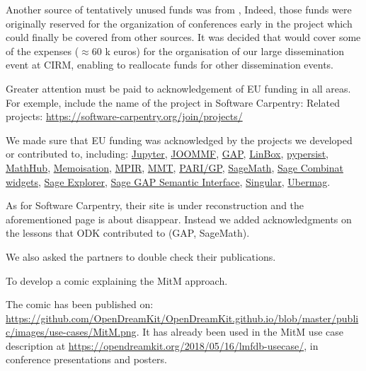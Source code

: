 Another source of tentatively unused funds was from ,
Indeed, those funds were originally reserved for the organization of
conferences early in the project which could finally be covered from
other sources. It was decided that  would cover some of
the expenses ($\approx$60 k euros) for the organisation of our large
dissemination event at CIRM, enabling  to reallocate funds
for other dissemination events.

\begin{recommendation}
  Greater attention must be paid to acknowledgement of EU funding in
  all areas. For exemple, include the name of the project in Software
  Carpentry: Related projects:
  \url{https://software-carpentry.org/join/projects/}
\end{recommendation}

We made sure that EU funding was acknowledged by the projects we
developed or contributed to, including:
\href{https://jupyter.org/about}{Jupyter},
\href{http://joommf.github.io/}{JOOMMF},
\href{https://www.gap-system.org/Contacts/funding.html}{GAP},
\href{https://linalg.org/support.html}{LinBox},
\href{https://pypersist.readthedocs.io/}{pypersist},
\href{https://mathhub.info/}{MathHub},
\href{https://gap-packages.github.io/Memoisation/}{Memoisation},
\href{http://www.mpir.org/news.html}{MPIR},
\href{https://uniformal.github.io//doc/}{MMT},
\href{https://pari.math.u-bordeaux.fr/funding.html}{PARI/GP},
\href{https://www.sagemath.org/development-ack.html}{SageMath},
\href{https://github.com/sagemath/sage-combinat-widgets}{Sage Combinat widgets},
\href{https://github.com/sagemath/sage-explorer}{Sage Explorer},
\href{https://github.com/nthiery/sage-gap-semantic-interface}{Sage GAP Semantic Interface},
\href{https://www.singular.uni-kl.de/index.php/background/funding.html}{Singular},
\href{https://ubermag.github.io/}{Ubermag}.

As for Software Carpentry, their site is under reconstruction and the
aforementioned page is about disappear. Instead we added
acknowledgments on the lessons that ODK contributed to (GAP,
SageMath).

We also asked the partners to double check their publications.


\begin{recommendation}
  To develop a comic explaining the MitM approach.
\end{recommendation}
The comic has been published on:
\url{https://github.com/OpenDreamKit/OpenDreamKit.github.io/blob/master/public/images/use-cases/MitM.png}. It
has already been used in the MitM use case description at
\url{https://opendreamkit.org/2018/05/16/lmfdb-usecase/}, in conference presentations and
posters.

